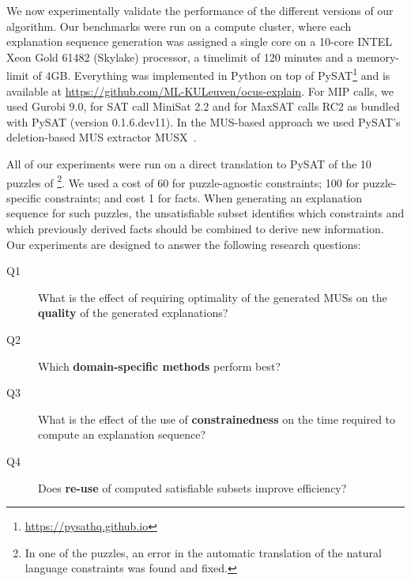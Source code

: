 
We now experimentally validate the performance of the different versions of our algorithm.
Our benchmarks were run on a compute cluster, where each explanation sequence generation was assigned a single core on a 10-core INTEL Xeon Gold 61482 (Skylake) processor, a timelimit of 120 minutes and a memory-limit of 4GB. 
Everything was implemented in Python on top of PySAT\footnote{\url{https://pysathq.github.io}} and is available at \url{https://github.com/ML-KULeuven/ocus-explain}. 
For MIP calls, we used Gurobi 9.0, for SAT call MiniSat 2.2 and for MaxSAT calls RC2 as bundled with PySAT (version 0.1.6.dev11). In the MUS-based approach we used PySAT's deletion-based MUS extractor MUSX~\cite{marques2010minimal}.

All of our experiments were run on a direct translation to PySAT of the 10 puzzles of \citet{ecai/BogaertsGCG20}\footnote{In one of the puzzles, an error in the automatic translation of the natural language constraints was found and fixed.}. %
We used a cost of 60 for puzzle-agnostic constraints; 100 for puzzle-specific constraints; and cost 1 for facts.
When generating an explanation sequence for such puzzles, the unsatisfiable subset identifies which constraints and which previously derived facts should be combined to derive new information. 
%
Our experiments are designed to answer the following research questions: 
\begin{description}
 \item[Q1] What is the effect of requiring optimality of the generated MUSs on the \textbf{quality} of the generated explanations? 
 \item[Q2] Which \textbf{domain-specific \grow methods} perform best?
 \item[Q3] What is the effect of the use of \textbf{constrainedness} on the time required to compute an explanation sequence?
 \item[Q4] Does \textbf{re-use} of computed satisfiable subsets improve efficiency?
\end{description}




